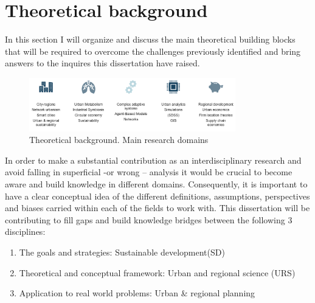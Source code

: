 
\chapter{Theoretical background}


In this section I will organize and discuss the main theoretical building blocks that will be required to overcome the challenges previously identified and bring answers to the inquires this dissertation have raised. \par





\begin{figure}[h!]
    \centering
    \includegraphics[width=0.8\textwidth]{sections/asset/theo.PNG}
    \caption{Theoretical background. Main research domains}
    \label{fig:theo}
\end{figure}





In order to make a substantial contribution as an interdisciplinary research and avoid falling in superficial -or wrong – analysis it would be crucial to become aware and build knowledge in different domains. Consequently, it is important to have a clear conceptual idea of the different definitions, assumptions, perspectives and biases carried within each of the fields to work with.
This dissertation will be contributing to fill gaps and build knowledge bridges between the following 3 disciplines:\par

\begin{enumerate}

    \item The goals and strategies: Sustainable development(SD)
    \item Theoretical and conceptual framework: Urban and regional science (URS)
    \item Application to real world problems: Urban \& regional planning
    
\end{enumerate}

